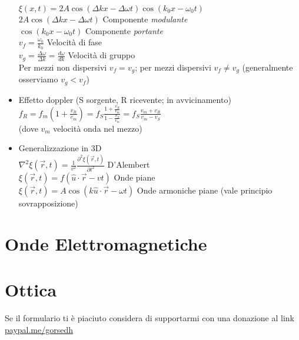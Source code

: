 \documentclass[a4paper]{article}
\begin{document}
\begin{itemize}
 	$\xi(x,t)=2A\cos(\Delta k x-\Delta \omega t)\cos(k_0 x-\omega_0t)$\\
 	$2A\cos(\Delta k x-\Delta \omega t)$ \hspace{0.4cm} Componente \textit{modulante}\\
 	$\cos(k_0 x-\omega_0t)$ \hspace{0.4cm} Componente \textit{portante}\\
 	$v_f=\frac{\omega_0}{k_0}$ \hspace{0.4cm} Velocità di fase\\
 	$v_g=\frac{\Delta \omega}{\Delta k} =\frac{d\omega}{dk}$ \hspace{0.4cm} Velocità di gruppo\\
 	Per mezzi non dispersivi $v_f=v_g$; per mezzi dispersivi $v_f\neq v_g$ (generalmente osserviamo $v_g<v_f$)
 	\item Effetto doppler (S sorgente, R ricevente; in avvicinamento)\\ 
 	$f_R=f_m(1+\frac{v_R}{v_m})=f_S\frac{1+\frac{v_R}{v_m}}{1-\frac{v_S}{v_m}}=f_S \frac{v_m + v_R}{v_m-v_S}$ \\
 	(dove $v_m$ velocità onda nel mezzo)
 	\item Generalizzazione in  3D\\
 	$\nabla^2 \xi(\overrightarrow{r},t)=\frac{1}{v^2}\frac{\partial^2 \xi(\overrightarrow{r},t)}{\partial t^2}$ D'Alembert\\
 	$\xi(\overrightarrow{r},t)=f(\hat{u}  \cdot \overrightarrow{r}-vt)$ Onde piane\\
 	$\xi(\overrightarrow{r},t)=A\cos(k\hat{u}\cdot \overrightarrow{r}-\omega t)$ Onde armoniche piane (vale principio sovrapposizione)
 	
 \end{itemize}	


\section{Onde Elettromagnetiche}
\section{Ottica}

Se il formulario ti è piaciuto considera di supportarmi con una donazione al link \href{paypal.me/gorsedh}{paypal.me/gorsedh}
\end{document}
